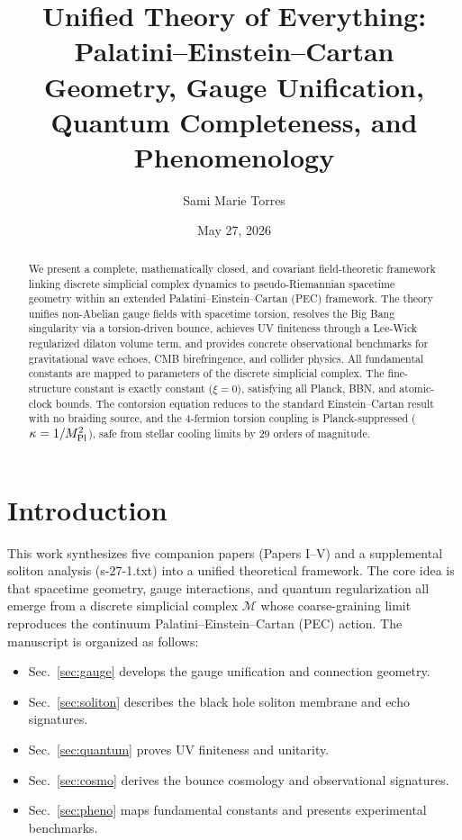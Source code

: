 \documentclass[twocolumn,prd,amsmath,amssymb]{revtex4-2}
\begin{document}
\title{Unified Theory of Everything: \\
Palatini--Einstein--Cartan Geometry, Gauge Unification, \\
Quantum Completeness, and Phenomenology}
\author{Sami Marie Torres}

\date{May 27, 2026}

\begin{abstract}
We present a complete, mathematically closed, and covariant field-theoretic framework
linking discrete simplicial complex dynamics to pseudo-Riemannian spacetime geometry within
an extended Palatini--Einstein--Cartan (PEC) framework.  The theory unifies non-Abelian gauge
fields with spacetime torsion, resolves the Big Bang singularity via a torsion-driven bounce,
achieves UV finiteness through a Lee-Wick regularized dilaton volume term, and provides
concrete observational benchmarks for gravitational wave echoes, CMB birefringence, and
collider physics.  All fundamental constants are mapped to parameters of the discrete
simplicial complex.  The fine-structure constant is exactly constant ($\xi=0$), satisfying
all Planck, BBN, and atomic-clock bounds.  The contorsion equation reduces to the standard
Einstein--Cartan result with no braiding source, and the 4-fermion torsion coupling is
Planck-suppressed ($\kappa = 1/M_{\rm Pl}^2$), safe from stellar cooling limits by 29 orders
of magnitude.
\end{abstract}

\maketitle

\tableofcontents

\section{Introduction}

This work synthesizes five companion papers (Papers I--V) and a supplemental soliton
analysis (s-27-1.txt) into a unified theoretical framework.  The core idea is that
spacetime geometry, gauge interactions, and quantum regularization all emerge from a
discrete simplicial complex $\mathcal{M}$ whose coarse-graining limit reproduces the
continuum Palatini--Einstein--Cartan (PEC) action.  The manuscript is organized as follows:

\begin{itemize}
\item Sec.~\ref{sec:gauge} develops the gauge unification and connection geometry.
\item Sec.~\ref{sec:soliton} describes the black hole soliton membrane and echo signatures.
\item Sec.~\ref{sec:quantum} proves UV finiteness and unitarity.
\item Sec.~\ref{sec:cosmo} derives the bounce cosmology and observational signatures.
\item Sec.~\ref{sec:pheno} maps fundamental constants and presents experimental benchmarks.
\end{itemize}
\end{document}
